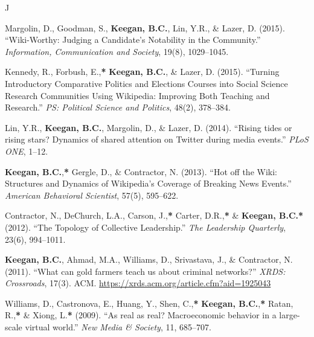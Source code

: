 \documentclass{cv}
\begin{document}
\begin{entries}{J}
		\item Margolin, D., Goodman, S., \textbf{Keegan, B.C.}, Lin, Y.R., \& Lazer, D. (2015). ``Wiki-Worthy: Judging a Candidate's Notability in the Community.'' \textit{Information, Communication and Society}, 19(8), 1029--1045. 
		\item Kennedy, R., Forbush, E.,\textbf{*} \textbf{Keegan, B.C.}, \& Lazer, D. (2015). ``Turning Introductory Comparative Politics and Elections Courses into Social Science Research Communities Using Wikipedia: Improving Both Teaching and Research.'' \textit{PS: Political Science and Politics}, 48(2), 378--384. 
		\item Lin, Y.R., \textbf{Keegan, B.C.}, Margolin, D., \& Lazer, D. (2014). ``Rising tides or rising stars? Dynamics of shared attention on Twitter during media events.'' \textit{PLoS ONE}, 1--12. 
		\item \textbf{Keegan, B.C.},\textbf{*} Gergle, D., \& Contractor, N. (2013). ``Hot off the Wiki: Structures and Dynamics of Wikipedia's Coverage of Breaking News Events.'' \textit{American Behavioral Scientist}, 57(5), 595--622. 
		\item Contractor, N., DeChurch, L.A., Carson, J.,\textbf{*} Carter, D.R.,\textbf{*} \& \textbf{Keegan, B.C.}\textbf{*} (2012). ``The Topology of Collective Leadership.'' \textit{The Leadership Quarterly}, 23(6), 994--1011. 
		\item \textbf{Keegan, B.C.}, Ahmad, M.A., Williams, D., Srivastava, J., \& Contractor, N. (2011). ``What can gold farmers teach us about criminal networks?'' \textit{XRDS: Crossroads}, 17(3). ACM. \url{https://xrds.acm.org/article.cfm?aid=1925043}
		\item Williams, D., Castronova, E., Huang, Y., Shen, C.,\textbf{*} \textbf{Keegan, B.C.},\textbf{*} Ratan, R.,\textbf{*} \& Xiong, L.\textbf{*} (2009). ``As real as real? Macroeconomic behavior in a large-scale virtual world.'' \textit{New Media \& Society}, 11, 685--707. 
	\end{entries}
\end{document}
